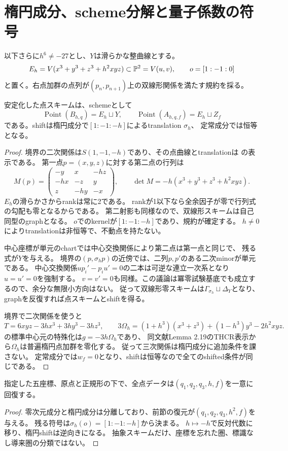 \section{楕円成分、scheme分解と量子係数の符号}
以下さらに$h^6\ne-27$とし、$Y$は滑らかな整曲線とする。
\[
 E_h=V(x^3+y^3+z^3+h^2xyz)\subset\mathbb P^2=V(u,v),\qquad o=[1:-1:0]
\]
と置く。右点加群の点列が$(p_n,p_{n+1})$上の双線形関係を満たす規約を採る。

\begin{theorem}[全点スキームとshift]
安定化した点スキームは、schemeとして
\[
 \operatorname{Point}(B_{h,q})=E_h\sqcup Y,\qquad
 \operatorname{Point}(A_{h,q,f})=E_h\sqcup Z_f
\]
である。shiftは楕円成分で$[1:-1:-h]$によるtranslation $\sigma_h$、
定常成分では恒等となる。
\end{theorem}
\begin{proof}
境界の二次関係は$S(1,-1,-h)$であり、その点曲線とtranslationは
\cite[Definition--Lemma 2.13]{WWY}の表示である。
第一点$p=(x,y,z)$に対する第二点の行列は
\[
 M(p)=\begin{pmatrix}-y&x&-hz\\-hx&-z&y\\z&-hy&-x\end{pmatrix},
 \qquad\det M=-h(x^3+y^3+z^3+h^2xyz).
\]
$E_h$の滑らかさからrankは常に2である。
rankが1以下なら全余因子が零で行列式の勾配も零となるからである。
第二射影も同様なので、双線形スキームは自己同型のgraphとなる。
$o$でのkernelが$[1:-1:-h]$であり、規約が確定する。
$h\ne0$によりtranslationは非恒等で、不動点を持たない。

中心座標が単元のchartでは中心交換関係により第二点は第一点と同じで、
残る式が$Y$を与える。
境界の$(p,\sigma_hp)$の近傍では、二列$p,p'$のある二次minorが単元である。
中心交換関係$up_i'-p_i u'=0$の二本は可逆な連立一次系となり$u=u'=0$を強制する。
$v=v'=0$も同様。この議論は冪零試験基底でも成立するので、余分な無限小方向はない。
従って双線形零スキームは$\Gamma_{\sigma_h}\sqcup\Delta_Y$となり、
graphを反復すれば点スキームとshiftを得る。

境界で二次関係を使うと
\[
 T=6xyz-3hx^3+3hy^3-3hz^3,\qquad
 3\Omega_h=(1+h^3)(x^3+z^3)+(1-h^3)y^3-2h^2xyz.
\]
\cite[(2.20)]{WWY}の標準中心元の特殊化は$g=-3h\Omega_h$であり、
同文献Lemma 2.19のTHCR表示から$\Omega_h$は普遍楕円点加群を零化する。
従って三次関係は楕円成分に追加条件を課さない。
定常成分では$w_f=0$となり、shiftは恒等なので全てのshifted条件が同じである。
\end{proof}
\begin{corollary}[埋込みとshiftを指定した点データによる復元]
指定した五座標、原点と正規形の下で、全点データは$(q_1,q_2,q_3,h,f)$を一意に回復する。
\end{corollary}
\begin{proof}
零次元成分と楕円成分は分離しており、前節の復元が$(q_1,q_2,q_3,h^2,f)$を与える。
残る符号は$\sigma_h(o)=[1:-1:-h]$から決まる。
$h\mapsto-h$で反対代数に移り、楕円shiftは逆向きになる。
抽象スキームだけ、座標を忘れた圏、標識なし導来圏の分類ではない。
\end{proof}
